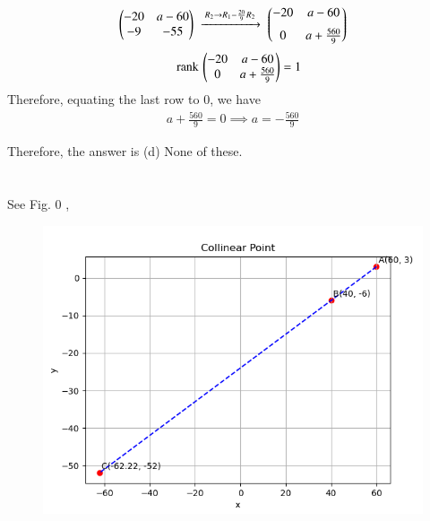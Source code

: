 \documentclass[journal]{IEEEtran}
\begin{document}
\begin{align}
\begin{pmatrix}-20 & a-60 \\ -9 & -55\end{pmatrix}
\;\xrightarrow{\,R_2 \to R_1 - \frac{20}{9}R_2\,}\;
\begin{pmatrix}-20 & a-60 \\[6pt] 0 & a + \frac{560}{9}\end{pmatrix}
\end{align}
\begin{align}
    \quad \text{rank}\,\begin{pmatrix}-20 & a-60 \\ 0 & a + \frac{560}{9}\end{pmatrix} = 1
\end{align}
Therefore, equating the last row to 0, we have
\begin{align}
    a + \frac{560}{9} = 0
    \implies a = -\frac{560}{9}
\end{align}

Therefore, the answer is (d) None of these.\\\\\\

See Fig. 0 ,
\begin{figure}[H]
\begin{center}
\includegraphics[width=0.6\columnwidth]{figs/fig.png}
\end{center}
\caption{}
\label{fig:Fig1}
\end{figure}
\end{document}
